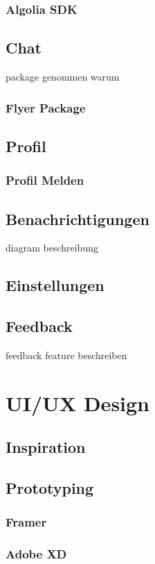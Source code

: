 \subsubsection{Algolia SDK}


\subsection{Chat}
package genommen warum
\subsubsection{Flyer Package}
\subsection{Profil}
\subsubsection{Profil Melden}

\subsection{Benachrichtigungen}
diagram beschreibung
\subsection{Einstellungen}
\subsection{Feedback}
feedback feature beschreiben


\section{UI/UX Design}
\subsection{Inspiration}

\subsection{Prototyping}
\subsubsection{Framer}
\subsubsection{Adobe XD}


